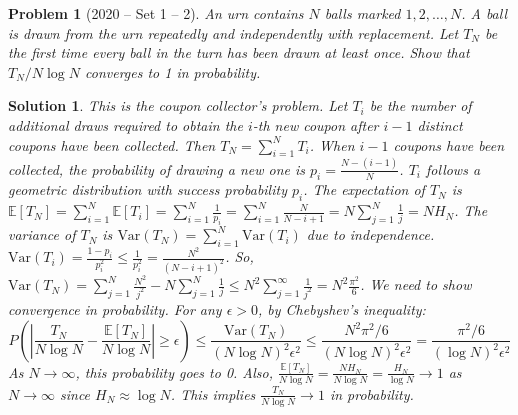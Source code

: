 \documentclass[12pt]{amsart}
\newtheorem{problem}{Problem}
\newtheorem*{solution}{Solution}
\begin{document}
\begin{problem}[2020 -- Set 1 -- 2]
An urn contains $N$ balls marked $1,2, \ldots, N$. A ball is drawn from the urn repeatedly and independently with replacement. Let $T_N$ be the first time every ball in the turn has been drawn at least once. Show that $T_N / N \log N$ converges to 1 in probability.
\end{problem}
\begin{solution}
This is the coupon collector's problem. Let $T_i$ be the number of additional draws required to obtain the $i$-th new coupon after $i-1$ distinct coupons have been collected. Then $T_N = \sum_{i=1}^N T_i$.
When $i-1$ coupons have been collected, the probability of drawing a new one is $p_i = \frac{N-(i-1)}{N}$. $T_i$ follows a geometric distribution with success probability $p_i$.
The expectation of $T_N$ is $\mathbb{E}[T_N] = \sum_{i=1}^N \mathbb{E}[T_i] = \sum_{i=1}^N \frac{1}{p_i} = \sum_{i=1}^N \frac{N}{N-i+1} = N \sum_{j=1}^N \frac{1}{j} = N H_N$.
The variance of $T_N$ is $\text{Var}(T_N) = \sum_{i=1}^N \text{Var}(T_i)$ due to independence.
$\text{Var}(T_i) = \frac{1-p_i}{p_i^2} \le \frac{1}{p_i^2} = \frac{N^2}{(N-i+1)^2}$.
So, $\text{Var}(T_N) = \sum_{j=1}^N \frac{N^2}{j^2} - N\sum_{j=1}^N \frac{1}{j} \le N^2 \sum_{j=1}^\infty \frac{1}{j^2} = N^2 \frac{\pi^2}{6}$.
We need to show convergence in probability. For any $\epsilon > 0$, by Chebyshev's inequality:
$$ P\left( \left| \frac{T_N}{N\log N} - \frac{\mathbb{E}[T_N]}{N\log N} \right| \ge \epsilon \right) \le \frac{\text{Var}(T_N)}{(N\log N)^2 \epsilon^2} \le \frac{N^2 \pi^2/6}{(N\log N)^2 \epsilon^2} = \frac{\pi^2/6}{(\log N)^2 \epsilon^2} $$
As $N \to \infty$, this probability goes to 0.
Also, $\frac{\mathbb{E}[T_N]}{N\log N} = \frac{N H_N}{N\log N} = \frac{H_N}{\log N} \to 1$ as $N \to \infty$ since $H_N \approx \log N$.
This implies $\frac{T_N}{N\log N} \to 1$ in probability.
\end{solution}
\end{document}
